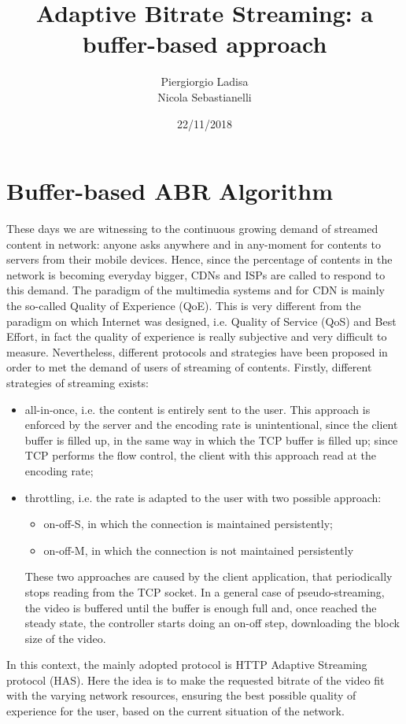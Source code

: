 \documentclass[a4paper]{report}
\title{Adaptive Bitrate Streaming: a buffer-based approach }
\author{Piergiorgio Ladisa
\\
Nicola Sebastianelli}
\date{22/11/2018}
\begin{document}
\maketitle
\tableofcontents
\listoffigures
\newpage

\part*{Buffer-based ABR Algorithm}
These days we are witnessing to the continuous growing demand of streamed content in network: anyone asks anywhere and in any-moment for contents to servers from their mobile devices. Hence, since the percentage of contents in the network is becoming everyday bigger, CDNs and ISPs are called to respond to this demand.
The paradigm of the multimedia systems and for CDN is mainly the so-called Quality of Experience (QoE). This is very different from the paradigm on which Internet was designed, i.e. Quality of Service (QoS) and Best Effort, in fact the quality of experience is really subjective and very difficult to measure. Nevertheless, different protocols and strategies have been proposed in order to met the demand of users of streaming of contents. 
Firstly, different strategies of streaming exists:
\begin{itemize}
\item all-in-once, i.e. the content is entirely sent to the user. This approach is enforced by the server and the encoding rate is unintentional, since the client buffer is filled up, in the same way in which the TCP buffer is filled up; since TCP performs the flow control, the client with this approach read at the encoding rate;
\item throttling, i.e. the rate is adapted to the user with two possible approach:
\begin{itemize}
\item on-off-S, in which the connection is maintained persistently;
\item on-off-M, in which the connection is not maintained persistently
\end{itemize}
These two approaches are caused by the client application, that periodically stops reading from the TCP socket. In a general case of  pseudo-streaming, the video is buffered until the buffer is enough full and, once reached the steady state, the controller starts doing an on-off step, downloading the block size of the video.
\end{itemize}
In this context, the mainly adopted protocol is HTTP Adaptive Streaming protocol (HAS). Here the idea is to make the requested bitrate of the video fit with the varying network resources, ensuring the best possible quality of experience for the user, based on the current situation of the network.
\end{document}
